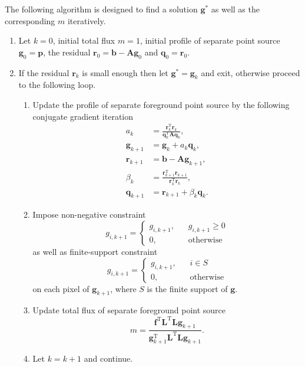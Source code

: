 \documentclass{article}
\newcommand{\vect}[1]{\mathbf{#1}}
\newcommand{\trans}[1]{\mathbf{#1}^\mathrm{T}}
\begin{document}
The following algorithm is designed to find a solution $\vect{g}^\ast$ as well as the corresponding $m$ iteratively.
\begin{enumerate}
\item Let $k = 0$, initial total flux $m = 1$, initial profile of separate point source $\vect{g}_0 = \vect{p}$, the residual $\vect{r}_0 = \vect{b} - \vect{A}\vect{g}_0$ and $\vect{q}_0 = \vect{r}_0$.
\item If the residual $\vect{r}_k$ is small enough then let $\vect{g}^\ast = \vect{g}_k$ and exit,
otherwise proceed to the following loop.
  \begin{enumerate}
    \item Update the profile of separate foreground point source by the following conjugate gradient iteration
    \begin{equation}
    \begin{aligned}
    a_k            & = \frac{\trans{r}_k \vect{r}_k}{\trans{q}_k\vect{A}\vect{q}_k}\text{,} \\
    \vect{g}_{k+1} & = \vect{g}_k + a_k \vect{q}_k\text{,} \\
    \vect{r}_{k+1} & = \vect{b} - \vect{A}\vect{g}_{k+1}\text{,} \\
    \beta_k        & = \frac{\trans{r}_{k+1}\vect{r}_{k+1}}{\trans{r}_{k}\vect{r}_{k}}\text{,} \\
    \vect{q}_{k+1} & = \vect{r}_{k+1} + \beta_k \vect{q}_k\text{.}
    \end{aligned}
    \end{equation}
    \item Impose non-negative constraint
    \begin{equation}
    g_{i,k+1} = \begin{cases}
    g_{i,k+1}\text{,} \quad & g_{i,k+1} \geq 0 \\
    0        \text{,} \quad & \text{otherwise}
    \end{cases}
    \end{equation}
    as well as finite-support constraint
    \begin{equation}
    g_{i,k+1} = \begin{cases}
    g_{i,k+1}\text{,} \quad & i \in S \\
            0\text{,} \quad & \text{otherwise}
    \end{cases}
    \end{equation}
    on each pixel of $\vect{g}_{k+1}$, where $S$ is the finite support of $\vect{g}$.
    \item Update total flux of separate foreground point source
    \begin{equation}
    m = \frac{\trans{f}\trans{L}\vect{L}\vect{g}_{k+1}}{\trans{g}_{k+1}\trans{L}\vect{L}\vect{g}_{k+1}}\text{.}
    \end{equation}
    \item Let $k = k+1$ and continue.
  \end{enumerate}
\end{enumerate}

\end{document}
